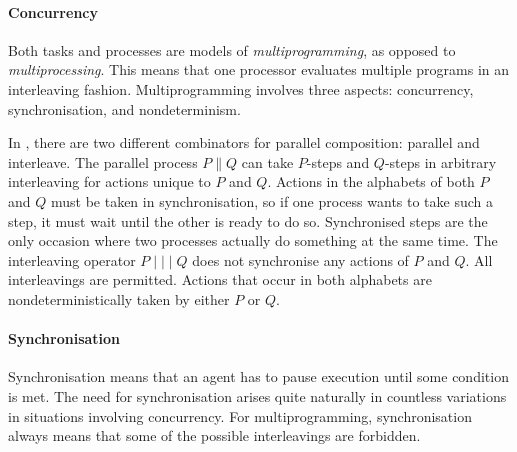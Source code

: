 



\paragraph{Concurrency}

Both tasks and processes are models of \emph{multiprogramming}, as opposed to \emph{multiprocessing}.
This means that one processor evaluates multiple programs in an interleaving fashion.
Multiprogramming involves three aspects: concurrency, synchronisation, and nondeterminism.

In \CSP, there are two different combinators for parallel composition: parallel and interleave.
The parallel process $P \parallel Q$ can take $P$-steps and $Q$-steps in arbitrary interleaving for actions unique to $P$ and $Q$.
Actions in the alphabets of both $P$ and $Q$ must be taken in synchronisation, so if one process wants to take such a step, it must wait until the other is ready to do so.
Synchronised steps are the only occasion where two processes actually do something at the same time.
%
The interleaving operator $P \mid\mid\mid Q$ does not synchronise any actions of $P$ and $Q$.
All interleavings are permitted.
Actions that occur in both alphabets are nondeterministically taken by either $P$ or $Q$.



\paragraph{Synchronisation}

Synchronisation means that an agent has to pause execution until some condition is met.
The need for synchronisation arises quite naturally in countless variations in situations involving concurrency.
For multiprogramming, synchronisation always means that some of the possible interleavings are forbidden.

